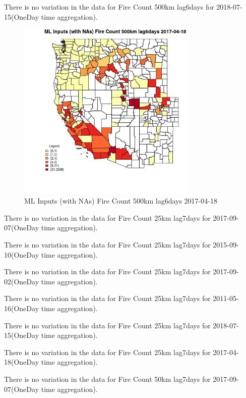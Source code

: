 There is no variation in the data for Fire Count 500km lag6days for 2018-07-15(OneDay time aggregation). 
 

\begin{figure} 
\centering  
\includegraphics[width=0.77\textwidth]{Code_Outputs/Report_ML_input_PM25_Step4_part_e_de_duplicated_aves_compiled_2019-05-21wNAs_CountyFire_Count_500km_lag6daysMean2017-04-18.jpg} 
\caption{\label{fig:Report_ML_input_PM25_Step4_part_e_de_duplicated_aves_compiled_2019-05-21wNAsCountyFire_Count_500km_lag6daysMean2017-04-18}ML Inputs (with NAs) Fire Count 500km lag6days 2017-04-18} 
\end{figure} 
 

There is no variation in the data for Fire Count 25km lag7days for 2017-09-07(OneDay time aggregation). 
 

There is no variation in the data for Fire Count 25km lag7days for 2015-09-10(OneDay time aggregation). 
 

There is no variation in the data for Fire Count 25km lag7days for 2017-09-02(OneDay time aggregation). 
 

There is no variation in the data for Fire Count 25km lag7days for 2011-05-16(OneDay time aggregation). 
 

There is no variation in the data for Fire Count 25km lag7days for 2018-07-15(OneDay time aggregation). 
 

There is no variation in the data for Fire Count 25km lag7days for 2017-04-18(OneDay time aggregation). 
 

There is no variation in the data for Fire Count 50km lag7days for 2017-09-07(OneDay time aggregation). 
 

